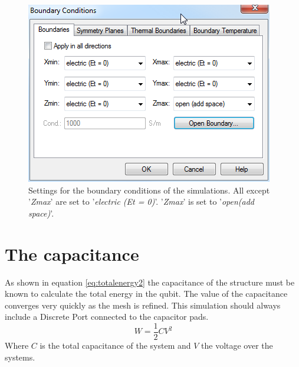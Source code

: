 \begin{figure}[h]
	\begin{center}
		\includegraphics[scale = .7]{Figures/Boundaries}
		\caption{Settings for the boundary conditions of the simulations. All except '\textit{Zmax}' are set to '\textit{electric (Et = 0)}'. '\textit{Zmax}' is set to '\textit{open(add space)}'.}
		\label{fig:Boundaries}
	\end{center}
\end{figure}

\section{The capacitance}
As shown in equation \eqref{eq:totalenergy2} the capacitance of the structure must be known to calculate the total energy in the qubit. The value of the capacitance converges very quickly as the mesh is refined. This simulation should always include a Discrete Port connected to the capacitor pads.
\begin{equation} \label{eq:totalenergy2}
W=\frac{1}{2}CV^{2}
\end{equation}
Where \(C\) is the total capacitance of the system and \(V\) the voltage over the systems.

% 
